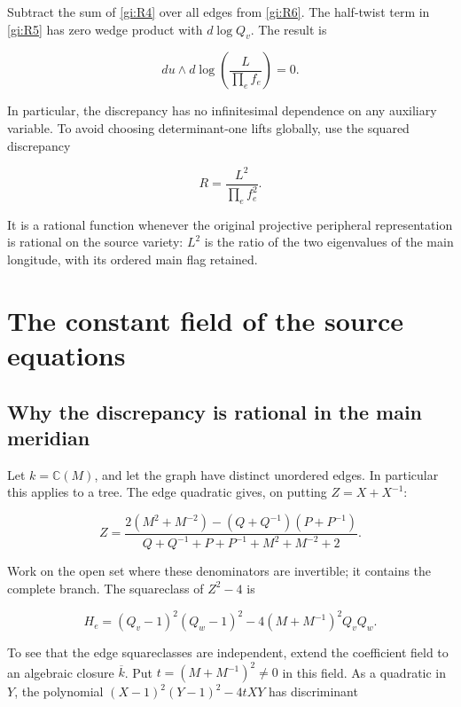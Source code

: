 Subtract the sum of \eqref{gi:R4} over all edges from \eqref{gi:R6}. The half-twist term
in \eqref{gi:R5} has zero wedge product with \(d\log Q_v\). The result is

\begin{equation}\label{gi:R7}
du\wedge d\log\left(\frac{L}{\prod_e f_e}\right)=0.
\end{equation}

In particular, the discrepancy has no infinitesimal dependence on any
auxiliary variable. To avoid choosing determinant-one lifts globally,
use the squared discrepancy

\begin{equation}\label{gi:R8}
R=\frac{L^2}{\prod_e f_e^2}.
\end{equation}

It is a rational function whenever the original projective peripheral
representation is rational on the source variety: \(L^2\) is the
ratio of the two eigenvalues of the main longitude, with its ordered
main flag retained.

\section{The constant field of the source equations}\label{gi:the-constant-field-of-the-source-equations}

\subsection{Why the discrepancy is rational in the main meridian}\label{gi:why-the-discrepancy-is-rational-in-the-main-meridian}

Let \(k=\mathbb C(M)\), and let the graph have distinct unordered
edges. In particular this applies to a tree. The edge quadratic
gives, on putting \(Z=X+X^{-1}\):

\begin{equation}\label{gi:R9}
Z=\frac{2(M^2+M^{-2})-(Q+Q^{-1})(P+P^{-1})}
 {Q+Q^{-1}+P+P^{-1}+M^2+M^{-2}+2}.
\end{equation}

Work on the open set where these denominators are invertible; it
contains the complete branch. The squareclass of \(Z^2-4\) is

\begin{equation}\label{gi:R10}
H_e=(Q_v-1)^2(Q_w-1)^2
                  -4(M+M^{-1})^2Q_vQ_w.
\end{equation}

To see that the edge squareclasses are independent, extend the
coefficient field to an algebraic closure \(\overline{k}\).
Put \(t=(M+M^{-1})^2\ne0\) in this field. As a quadratic in
\(Y\), the polynomial
\((X-1)^2(Y-1)^2-4tXY\) has discriminant

